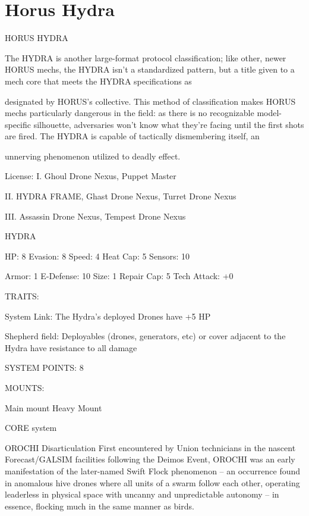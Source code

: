 \section{Horus Hydra}


                                           HORUS HYDRA

The HYDRA is another large-format protocol classification; like other, newer HORUS mechs, the HYDRA
isn’t a standardized pattern, but a title given to a mech core that meets the HYDRA specifications as

designated by HORUS’s collective. This method of classification makes HORUS mechs particularly
dangerous in the field: as there is no recognizable model-specific silhouette, adversaries won’t know what
they’re facing until the first shots are fired. The HYDRA is capable of tactically dismembering itself, an

unnerving phenomenon utilized to deadly effect.

                                                  License:
I. Ghoul Drone Nexus, Puppet Master

II. HYDRA FRAME, Ghast Drone Nexus, Turret Drone Nexus

III. Assassin Drone Nexus, Tempest Drone Nexus


                                                  HYDRA

 HP: 8          Evasion: 8                            Speed:  4          Heat Cap: 5       Sensors: 10

 Armor: 1       E-Defense: 10                         Size: 1            Repair Cap: 5     Tech Attack:
                                                                                           +0

                                                  TRAITS:

 System Link: The Hydra’s deployed Drones have +5 HP

 Shepherd field: Deployables (drones, generators, etc) or cover adjacent to the Hydra have resistance
 to all damage

                                            SYSTEM POINTS: 8

                                                 MOUNTS:

 Main mount                        Heavy Mount

                                               CORE system




                                               OROCHI Disarticulation
 First encountered by Union technicians in the nascent Forecast/GALSIM facilities following the Deimos
 Event, OROCHI was an early manifestation of the later-named Swift Flock phenomenon -- an
 occurrence found in anomalous hive drones where all units of a swarm follow each other, operating
 leaderless in physical space with uncanny and unpredictable autonomy -- in essence, flocking much in
  the same manner as birds.

